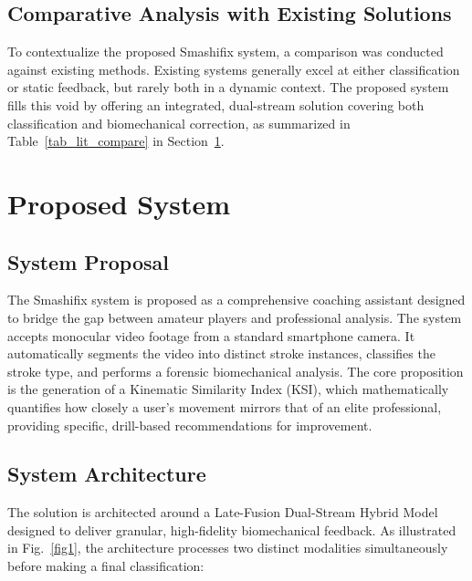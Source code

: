 \documentclass[pdflatex,sn-mathphys-num]{sn-jnl}
\theoremstyle{thmstyleone}%
\theoremstyle{thmstyletwo}%
\theoremstyle{thmstylethree}%
\begin{document}
\subsection{Comparative Analysis with Existing Solutions}
To contextualize the proposed Smashifix system, a comparison was conducted against existing methods. Existing systems generally excel at either classification or static feedback, but rarely both in a dynamic context. The proposed system fills this void by offering an integrated, dual-stream solution covering both classification and biomechanical correction, as summarized in Table~\ref{tab_lit_compare} in Section~\ref{sec3}.


\section{Proposed System}\label{sec3}

\subsection{System Proposal}
The Smashifix system is proposed as a comprehensive coaching assistant designed to bridge the gap between amateur players and professional analysis. The system accepts monocular video footage from a standard smartphone camera. It automatically segments the video into distinct stroke instances, classifies the stroke type, and performs a forensic biomechanical analysis. The core proposition is the generation of a Kinematic Similarity Index (KSI), which mathematically quantifies how closely a user's movement mirrors that of an elite professional, providing specific, drill-based recommendations for improvement.

\subsection{System Architecture}
The solution is architected around a Late-Fusion Dual-Stream Hybrid Model designed to deliver granular, high-fidelity biomechanical feedback. As illustrated in Fig.~\ref{fig1}, the architecture processes two distinct modalities simultaneously before making a final classification:
\end{document}
